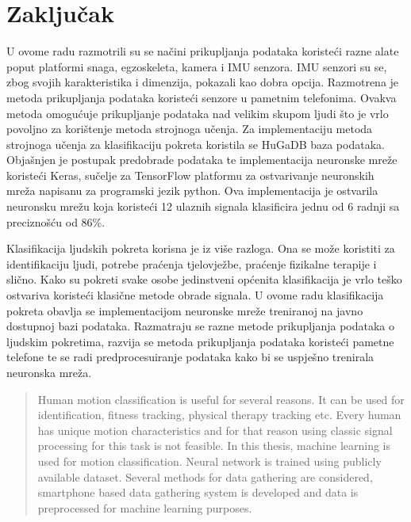 \documentclass[times, utf8, diplomski]{fer}
\begin{document}
\chapter{Zaključak}
U ovome radu razmotrili su se načini prikupljanja podataka koristeći razne alate poput platformi snaga,
egzoskeleta, kamera i IMU senzora. IMU senzori su se, zbog svojih karakteristika i dimenzija, pokazali
kao dobra opcija. Razmotrena je metoda prikupljanja podataka koristeći senzore u pametnim telefonima.
Ovakva metoda omogućuje prikupljanje podataka nad velikim skupom ljudi što je vrlo povoljno za korištenje
metoda strojnoga učenja. Za implementaciju metoda strojnoga učenja za klasifikaciju pokreta koristila
se HuGaDB baza podataka. Objašnjen je postupak predobrade podataka te implementacija neuronske mreže
koristeći Keras, sučelje za TensorFlow platformu za ostvarivanje neuronskih mreža napisanu za programski
jezik python. Ova implementacija je ostvarila neuronsku mrežu koja koristeći 12 ulaznih signala
klasificira jednu od 6 radnji sa preciznošću od 86\%. 





\begin{sazetak}
Klasifikacija ljudskih pokreta korisna je iz više razloga. Ona se može koristiti za identifikaciju ljudi,
potrebe praćenja tjelovježbe, praćenje fizikalne terapije i slično. Kako su pokreti svake osobe jedinstveni
općenita klasifikacija je vrlo teško ostvariva koristeći klasične metode obrade signala. U ovome radu
klasifikacija pokreta obavlja se implementacijom neuronske mreže treniranoj na javno dostupnoj bazi podataka.
Razmatraju se razne metode prikupljanja podataka o ljudskim pokretima, razvija se metoda prikupljanja podataka
koristeći pametne telefone te se radi predprocesuiranje podataka kako bi se uspješno trenirala neuronska mreža.

\end{sazetak}

\begin{abstract}
Human motion classification is useful for several reasons. It can be used for identification,
fitness tracking, physical therapy tracking etc. Every human has unique motion characteristics
and for that reason using classic signal processing for this task is not feasible. In this thesis,
machine learning is used for motion classification. Neural network is trained using publicly
available dataset. Several methods for data gathering are considered, smartphone based data
gathering system is developed and data is preprocessed for machine learning purposes.


\end{abstract}
\end{document}
